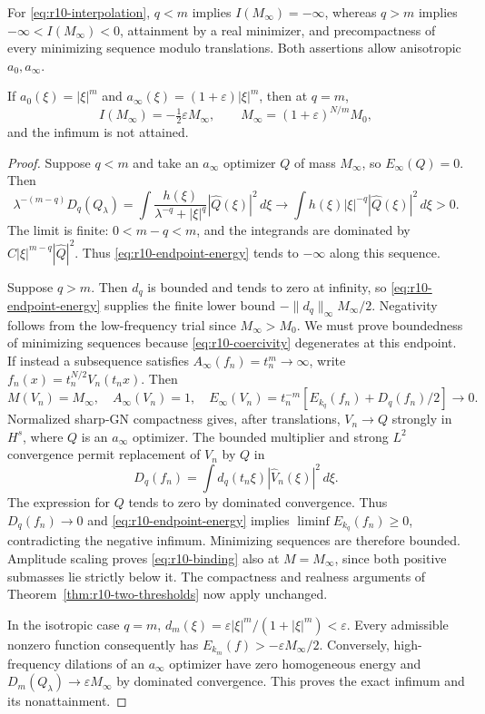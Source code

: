 \begin{theorem}
\label{thm:r10-endpoint}
For \eqref{eq:r10-interpolation}, $q<m$ implies
$I(M_\infty)=-\infty$, whereas $q>m$ implies
$-\infty<I(M_\infty)<0$, attainment by a real minimizer, and
precompactness of every minimizing sequence modulo translations.
Both assertions allow anisotropic $a_0,a_\infty$.

If $a_0(\xi)=|\xi|^m$ and
$a_\infty(\xi)=(1+\varepsilon)|\xi|^m$, then at $q=m$,
\begin{equation}\label{eq:r10-borderline-endpoint}
 I(M_\infty)=-\tfrac12\varepsilon M_\infty,
 \qquad M_\infty=(1+\varepsilon)^{N/m}M_0,
\end{equation}
and the infimum is not attained.
\end{theorem}

\begin{proof}
Suppose $q<m$ and take an $a_\infty$ optimizer $Q$ of mass
$M_\infty$, so $E_\infty(Q)=0$. Then
\[
 \lambda^{-(m-q)}D_q(Q_\lambda)
 =\int\frac{h(\xi)}{\lambda^{-q}+|\xi|^q}|\widehat Q(\xi)|^2\,d\xi
 \longrightarrow
 \int h(\xi)|\xi|^{-q}|\widehat Q(\xi)|^2\,d\xi>0.
\]
The limit is finite: $0<m-q<m$, and the integrands are dominated by
$C|\xi|^{m-q}|\widehat Q|^2$. Thus
\eqref{eq:r10-endpoint-energy} tends to $-\infty$ along this sequence.

Suppose $q>m$. Then $d_q$ is bounded and tends to zero at infinity, so
\eqref{eq:r10-endpoint-energy} supplies the finite lower bound
$-\|d_q\|_\infty M_\infty/2$. Negativity follows from the
low-frequency trial since $M_\infty>M_0$. We must prove boundedness of
minimizing sequences because \eqref{eq:r10-coercivity} degenerates at
this endpoint. If instead a subsequence satisfies
$A_\infty(f_n)=t_n^m\to\infty$, write
$f_n(x)=t_n^{N/2}V_n(t_nx)$. Then
\[
 M(V_n)=M_\infty,\quad A_\infty(V_n)=1,\quad
 E_\infty(V_n)=t_n^{-m}[E_{k_q}(f_n)+D_q(f_n)/2]\longrightarrow0.
\]
Normalized sharp-GN compactness gives, after translations,
$V_n\to Q$ strongly in $H^s$, where $Q$ is an $a_\infty$ optimizer.
The bounded multiplier and strong $L^2$ convergence permit replacement
of $V_n$ by $Q$ in
\[
 D_q(f_n)=\int d_q(t_n\xi)|\widehat V_n(\xi)|^2\,d\xi.
\]
The expression for $Q$ tends to zero by dominated convergence. Thus
$D_q(f_n)\to0$ and \eqref{eq:r10-endpoint-energy} implies
$\liminf E_{k_q}(f_n)\ge0$, contradicting the negative infimum.
Minimizing sequences are therefore bounded. Amplitude scaling proves
\eqref{eq:r10-binding} also at $M=M_\infty$, since both positive
submasses lie strictly below it. The compactness and realness arguments
of Theorem~\ref{thm:r10-two-thresholds} now apply unchanged.

In the isotropic case $q=m$,
$d_m(\xi)=\varepsilon|\xi|^m/(1+|\xi|^m)<\varepsilon$.
Every admissible nonzero function consequently has
$E_{k_m}(f)>-\varepsilon M_\infty/2$. Conversely, high-frequency
dilations of an $a_\infty$ optimizer have zero homogeneous energy and
$D_m(Q_\lambda)\to\varepsilon M_\infty$ by dominated convergence.
This proves the exact infimum and its nonattainment.
\end{proof}

